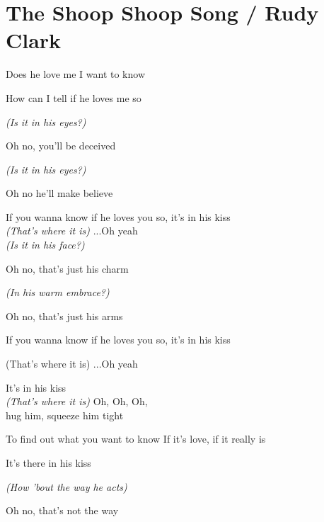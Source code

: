 \section{The Shoop Shoop Song / Rudy Clark}\label{sec:shoop_shoop_song}
\Cmajor
\Fmajor
\Gmajor
\Aminor
\Dminor
\Dseven
\Eseven


Does he love me I want to know

How can I tell if he loves me so

\emph{(Is it in his eyes?)}

Oh no, you'll be deceived

\emph{(Is it in his eyes?)}

Oh no he'll make believe

If you wanna know if he loves you so, it's in his kiss\\


\emph{(That's where it is)} ...Oh yeah\\


\emph{(Is it in his face?)}

Oh no, that's just his charm

\emph{(In his warm embrace?)}

Oh no, that's just his arms

If you wanna know if he loves you so, it's in his kiss 

(That's where it is) ...Oh yeah

It's in his kiss\\


\emph{(That's where it is)} Oh, Oh, Oh,\\


hug him, squeeze him tight

To find out what you want to know If it's love, if it really is

It's there in his kiss

\emph{(How 'bout the way he acts)}

Oh no, that's not the way

